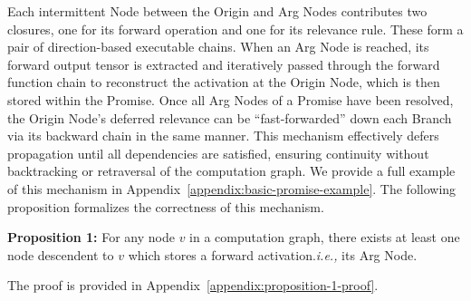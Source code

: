 \documentclass{article}
\begin{document}
Each intermittent Node between the Origin and Arg Nodes contributes two closures, one for its forward
operation and one for its relevance rule. These form a pair of direction-based executable chains.
When an Arg Node is reached, its forward output tensor is extracted and iteratively passed through the forward
function chain to reconstruct the activation at the Origin Node, which is then stored within the Promise. Once
all Arg Nodes of a Promise have been resolved, the Origin Node’s deferred relevance can be “fast-forwarded” down
each Branch via its backward chain in the same manner. This mechanism effectively defers propagation until all
dependencies are satisfied, ensuring continuity without backtracking or retraversal of the computation graph.
We provide a full example of this mechanism in Appendix~\ref{appendix:basic-promise-example}. 
The following proposition formalizes the correctness of this mechanism.

\textbf{Proposition 1:} For any node $v$ in a computation graph, there exists at least one node descendent to $v$
which stores a forward activation.\textit{i.e.,} its Arg Node.

The proof is provided in Appendix~\ref{appendix:proposition-1-proof}.
\end{document}
